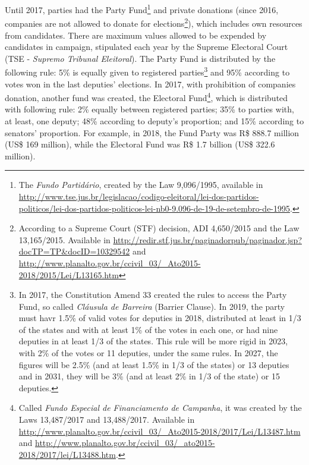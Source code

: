 \documentclass[
  12pt,
]{article}
\begin{document}
Until 2017, parties had the Party Fund\footnote{The \emph{Fundo
  Partidário}, created by the Law 9,096/1995, available in
  \url{http://www.tse.jus.br/legislacao/codigo-eleitoral/lei-dos-partidos-politicos/lei-dos-partidos-politicos-lei-nb0-9.096-de-19-de-setembro-de-1995}.}
and private donations (since 2016, companies are not allowed to donate
for elections\footnote{According to a Supreme Court (STF) decision, ADI
  4,650/2015 and the Law 13,165/2015. Available in
  \url{http://redir.stf.jus.br/paginadorpub/paginador.jsp?docTP=TP&docID=10329542}
  and
  \url{http://www.planalto.gov.br/ccivil_03/_Ato2015-2018/2015/Lei/L13165.htm}}),
which includes own resources from candidates. There are maximum values
allowed to be expended by candidates in campaign, stipulated each year
by the Supreme Electoral Court (TSE - \emph{Supremo Tribunal
Eleitoral}). The Party Fund is distributed by the following rule: 5\% is
equally given to registered parties\footnote{In 2017, the Constitution
  Amend 33 created the rules to access the Party Fund, so called
  \emph{Cláusula de Barreira} (Barrier Clause). In 2019, the party must
  havr 1.5\% of valid votes for deputies in 2018, distributed at least
  in 1/3 of the states and with at least 1\% of the votes in each one,
  or had nine deputies in at least 1/3 of the states. This rule will be
  more rigid in 2023, with 2\% of the votes or 11 deputies, under the
  same rules. In 2027, the figures will be 2.5\% (and at least 1.5\% in
  1/3 of the states) or 13 deputies and in 2031, they will be 3\% (and
  at least 2\% in 1/3 of the state) or 15 deputies.} and 95\% according
to votes won in the last deputies' elections. In 2017, with prohibition
of companies donation, another fund was created, the Electoral
Fund\footnote{Called \emph{Fundo Especial de Financiamento de Campanha},
  it was created by the Laws 13,487/2017 and 13,488/2017. Available in
  \url{http://www.planalto.gov.br/ccivil_03/_Ato2015-2018/2017/Lei/L13487.htm}
  and
  \url{http://www.planalto.gov.br/ccivil_03/_ato2015-2018/2017/lei/L13488.htm}.},
which is distributed with following rule: 2\% equally between registered
parties; 35\% to parties with, at least, one deputy; 48\% according to
deputy's proportion; and 15\% according to senators' proportion. For
example, in 2018, the Fund Party was R\$ 888.7 million (US\$ 169
million), while the Electoral Fund was R\$ 1.7 billion (US\$ 322.6
million).
\end{document}
